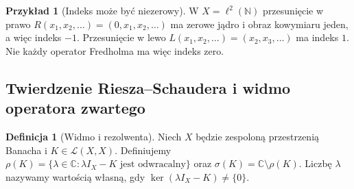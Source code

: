 \documentclass[11pt,a4paper]{article}
\numberwithin{equation}{section}
\theoremstyle{plain}
\theoremstyle{definition}
\newtheorem{definicja}[twierdzenie]{Definicja}
\newtheorem{przyklad}[twierdzenie]{Przykład}
\theoremstyle{remark}
\newcommand{\C}{\mathbb C}
\newcommand{\N}{\mathbb N}
\begin{document}
\begin{przyklad}[Indeks może być niezerowy]
\label{ex:shift-index30}
W $X=\ell^2(\N)$ przesunięcie w prawo
$R(x_1,x_2,\ldots)=(0,x_1,x_2,\ldots)$ ma zerowe jądro
i obraz kowymiaru jeden, a więc indeks $-1$.
Przesunięcie w lewo $L(x_1,x_2,\ldots)=(x_2,x_3,\ldots)$
ma indeks $1$. Nie każdy operator Fredholma ma więc
indeks zero.
\end{przyklad}

\subsection{Twierdzenie Riesza--Schaudera i widmo operatora zwartego}

\begin{definicja}[Widmo i rezolwenta]
\label{def:spectrum30}
Niech $X$ będzie zespoloną przestrzenią Banacha i
$K\in\mathcal L(X,X)$. Definiujemy
$\rho(K)=\{\lambda\in\C:\lambda I_X-K\text{ jest odwracalny}\}$
oraz $\sigma(K)=\C\setminus\rho(K)$.
Liczbę $\lambda$ nazywamy wartością własną, gdy
$\ker(\lambda I_X-K)\ne\{0\}$.
\end{definicja}
\end{document}
